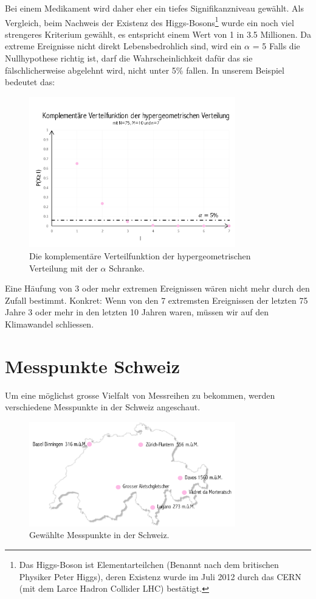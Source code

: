 \begin{refsection}
Bei einem Medikament wird daher eher ein tiefes Signifikanzniveau gewählt. Als Vergleich, beim Nachweis der Existenz des Higgs-Bosons\footnote{%
Das Higgs-Boson ist Elementarteilchen (Benannt nach dem britischen Physiker Peter Higgs), deren Existenz wurde im Juli 2012 durch das CERN (mit dem Larce Hadron Collider LHC) bestätigt.} wurde ein noch viel strengeres Kriterium gewählt, es entspricht einem Wert von 1 in 3.5 Millionen. Da extreme Ereignisse nicht direkt Lebensbedrohlich sind, wird ein $\alpha$ = 5%
Falls die Nullhypothese richtig ist, darf die Wahrscheinlichkeit dafür das sie fälschlicherweise abgelehnt wird, nicht unter 5\% fallen.
In unserem Beispiel bedeutet das:

\begin{figure}[htbp]
\centering
\includegraphics[width=0.8\textwidth]{extrem/Signi.pdf}
\caption{Die komplementäre Verteilfunktion der hypergeometrischen Verteilung mit der $\alpha$ Schranke.}
\label{Signifikanzniveau}
\end{figure}

Eine Häufung von 3 oder mehr extremen Ereignissen wären nicht mehr durch den Zufall bestimmt. Konkret: Wenn von den 7 extremsten Ereignissen der letzten 75 Jahre 3 oder mehr in den letzten 10 Jahren waren, müssen wir auf den Klimawandel schliessen.


\section{Messpunkte Schweiz} \label{Beispiele}
Um eine möglichst grosse Vielfalt von Messreihen zu bekommen, werden verschiedene Messpunkte in der Schweiz angeschaut. 

\begin{figure}[htbp]
\centering
\includegraphics[width=0.8\textwidth]{extrem/Schweiz.pdf}
\caption{Gewählte Messpunkte in der Schweiz.}
\label{MesspunkteSchweiz}
\end{figure}


\end{refsection}
